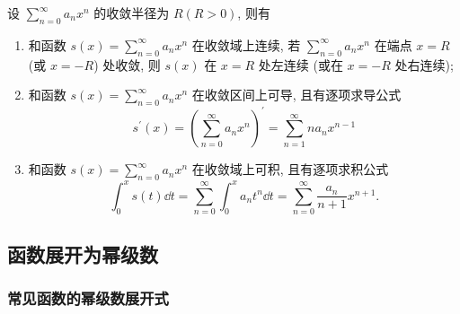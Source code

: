 \begin{theorem}[幂级数的性质]
    设 $\displaystyle \sum_{n=0}^{\infty} a_{n} x^{n} $ 的收敛半径为 $ R(R>0) $, 则有
    \begin{enumerate}[label=(\arabic{*})]
        \item 和函数 $\displaystyle s(x)=\sum_{n=0}^{\infty} a_{n} x^{n} $ 在收敛域上连续, 若 $\displaystyle \sum_{n=0}^{\infty} a_{n} x^{n} $ 在端点 $ x=R $ (或 $ x=-R$)  处收敛,
              则 $ s(x) $ 在 $ x=R $ 处左连续 (或在 $ x=-R $ 处右连续);
        \item 和函数 $\displaystyle s(x)=\sum_{n=0}^{\infty} a_{n} x^{n} $ 在收敛区间上可导, 且有逐项求导公式
              $$s^{\prime}(x)=\left(\sum_{n=0}^{\infty} a_{n} x^{n}\right)^{\prime}=\sum_{n=1}^{\infty} n a_{n} x^{n-1} $$
        \item 和函数 $\displaystyle s(x)=\sum_{n=0}^{\infty} a_{n} x^{n} $ 在收敛域上可积, 且有逐项求积公式
              $$\int_{0}^{x}s(t)\dd t=\sum_{n=0}^{\infty}\int_{0}^{x}a_nt^n\dd t=\sum_{n=0}^{\infty}\dfrac{a_n}{n+1}x^{n+1}.$$
    \end{enumerate}
\end{theorem}

\subsection{函数展开为幂级数}

\subsubsection{常见函数的幂级数展开式}

